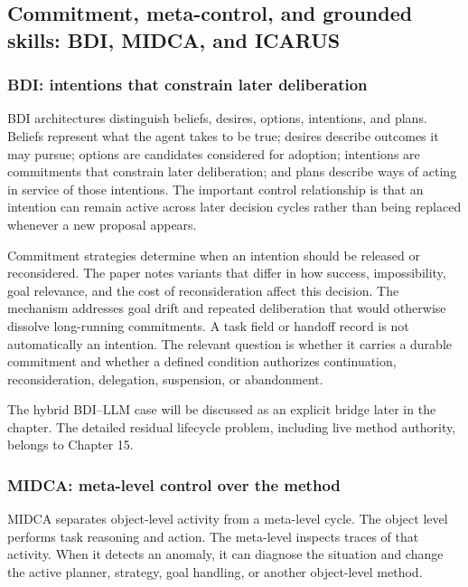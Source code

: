 \subsection{Commitment, meta-control, and grounded skills: BDI, MIDCA, and ICARUS}
\label{sec:ch11-bdi-midca-icarus}

\subsubsection{BDI: intentions that constrain later deliberation}

BDI architectures distinguish beliefs, desires, options, intentions, and plans. Beliefs represent what the agent takes to be true; desires describe outcomes it may pursue; options are candidates considered for adoption; intentions are commitments that constrain later deliberation; and plans describe ways of acting in service of those intentions. The important control relationship is that an intention can remain active across later decision cycles rather than being replaced whenever a new proposal appears.

Commitment strategies determine when an intention should be released or reconsidered. The paper notes variants that differ in how success, impossibility, goal relevance, and the cost of reconsideration affect this decision. The mechanism addresses goal drift and repeated deliberation that would otherwise dissolve long-running commitments. A task field or handoff record is not automatically an intention. The relevant question is whether it carries a durable commitment and whether a defined condition authorizes continuation, reconsideration, delegation, suspension, or abandonment.

The hybrid BDI--LLM case will be discussed as an explicit bridge later in the chapter. The detailed residual lifecycle problem, including live method authority, belongs to Chapter 15.

\subsubsection{MIDCA: meta-level control over the method}

MIDCA separates object-level activity from a meta-level cycle. The object level performs task reasoning and action. The meta-level inspects traces of that activity. When it detects an anomaly, it can diagnose the situation and change the active planner, strategy, goal handling, or another object-level method.

